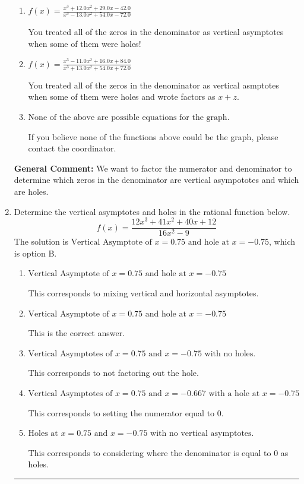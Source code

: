 \documentclass{extbook}[14pt]
\newcommand{\litem}[1]{\item #1

\rule{\textwidth}{0.4pt}}
\begin{document}
\begin{enumerate}
{\begin{enumerate}[label=\Alph*.]
This is the correct answer!
\item \( f(x)=\frac{x^{3} +12.0 x^{2} +29.0 x -42.0}{x^{3} -13.0 x^{2} +54.0 x -72.0} \)

You treated all of the zeros in the denominator as vertical asymptotes when some of them were holes!
\item \( f(x)=\frac{x^{3} -11.0 x^{2} +16.0 x + 84.0}{x^{3} +13.0 x^{2} +54.0 x + 72.0} \)

You treated all of the zeros in the denominator as vertical asmptotes when some of them were holes and wrote factors as $x+z$.
\item \( \text{None of the above are possible equations for the graph.} \)

If you believe none of the functions above could be the graph, please contact the coordinator.
\end{enumerate}

\textbf{General Comment:} We want to factor the numerator and denominator to determine which zeros in the denominator are vertical asympototes and which are holes.
}
\litem{
Determine the vertical asymptotes and holes in the rational function below.
\[ f(x) = \frac{12x^{3} +41 x^{2} +40 x + 12}{16x^{2} -9} \]The solution is \( \text{Vertical Asymptote of } x = 0.75 \text{ and hole at } x = -0.75 \), which is option B.\begin{enumerate}[label=\Alph*.]
\item \( \text{Vertical Asymptote of } x = 0.75 \text{ and hole at } x = -0.75 \)

This corresponds to mixing vertical and horizontal asymptotes.
\item \( \text{Vertical Asymptote of } x = 0.75 \text{ and hole at } x = -0.75 \)

This is the correct answer.
\item \( \text{Vertical Asymptotes of } x = 0.75 \text{ and } x = -0.75 \text{ with no holes.} \)

This corresponds to not factoring out the hole.
\item \( \text{Vertical Asymptotes of } x = 0.75 \text{ and } x = -0.667 \text{ with a hole at } x = -0.75 \)

This corresponds to setting the numerator equal to 0.
\item \( \text{Holes at } x = 0.75 \text{ and } x = -0.75 \text{ with no vertical asymptotes.} \)

This corresponds to considering where the denominator is equal to 0 as holes.
\end{enumerate}

}
\end{enumerate}
\end{document}
